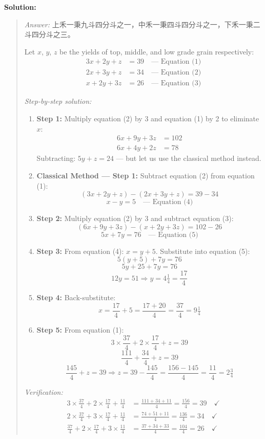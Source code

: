 \documentclass[11pt,a4paper]{article}
\newcommand{\zh}[1]{{#1}}
\newenvironment{chsolution}{%
  \par\medskip\noindent\textbf{\textcolor{notecolor}{Solution:}}\par\nopagebreak
  \begin{quote}\small
}{%
  \end{quote}\medskip
}
\newenvironment{stepbystep}{%
  \par\smallskip\noindent\textit{Step-by-step solution:}\par\nopagebreak
  \begin{enumerate}[leftmargin=2em,label=\textbf{Step \arabic*:},ref=\arabic*]
}{%
  \end{enumerate}\medskip
}
\begin{document}
\begin{chsolution}
\textit{Answer:} \zh{上禾一秉九斗四分斗之一，中禾一秉四斗四分斗之一，下禾一秉二斗四分斗之三。}

Let $x$, $y$, $z$ be the yields of top, middle, and low grade grain respectively:
\begin{align*}
3x + 2y + z &= 39 \quad \text{--- Equation (1)} \\
2x + 3y + z &= 34 \quad \text{--- Equation (2)} \\
x + 2y + 3z &= 26 \quad \text{--- Equation (3)}
\end{align*}

\begin{stepbystep}
\item \textbf{Step 1:} Multiply equation (2) by 3 and equation (1) by 2 to
eliminate $x$:
\begin{align*}
6x + 9y + 3z &= 102 \\
6x + 4y + 2z &= 78
\end{align*}
Subtracting: $5y + z = 24$ --- but let us use the classical method instead.

\item \textbf{Classical Method --- Step 1:} Subtract equation (2) from equation (1):
\[
(3x + 2y + z) - (2x + 3y + z) = 39 - 34
\]
\[
x - y = 5 \quad \text{--- Equation (4)}
\]

\item \textbf{Step 2:} Multiply equation (2) by 3 and subtract equation (3):
\[
(6x + 9y + 3z) - (x + 2y + 3z) = 102 - 26
\]
\[
5x + 7y = 76 \quad \text{--- Equation (5)}
\]

\item \textbf{Step 3:} From equation (4): $x = y + 5$. Substitute into equation (5):
\[
5(y+5) + 7y = 76
\]
\[
5y + 25 + 7y = 76
\]
\[
12y = 51 \Rightarrow y = 4\tfrac{1}{4} = \frac{17}{4}
\]

\item \textbf{Step 4:} Back-substitute:
\[
x = \frac{17}{4} + 5 = \frac{17 + 20}{4} = \frac{37}{4} = 9\tfrac{1}{4}
\]

\item \textbf{Step 5:} From equation (1):
\[
3 \times \frac{37}{4} + 2 \times \frac{17}{4} + z = 39
\]
\[
\frac{111}{4} + \frac{34}{4} + z = 39
\]
\[
\frac{145}{4} + z = 39 \Rightarrow z = 39 - \frac{145}{4} = \frac{156 - 145}{4} = \frac{11}{4} = 2\tfrac{3}{4}
\]
\end{stepbystep}

\textit{Verification:}
\begin{align*}
3 \times \frac{37}{4} + 2 \times \frac{17}{4} + \frac{11}{4} &= \frac{111 + 34 + 11}{4} = \frac{156}{4} = 39 \quad \checkmark \\
2 \times \frac{37}{4} + 3 \times \frac{17}{4} + \frac{11}{4} &= \frac{74 + 51 + 11}{4} = \frac{136}{4} = 34 \quad \checkmark \\
\frac{37}{4} + 2 \times \frac{17}{4} + 3 \times \frac{11}{4} &= \frac{37 + 34 + 33}{4} = \frac{104}{4} = 26 \quad \checkmark
\end{align*}
\end{chsolution}
\end{document}
